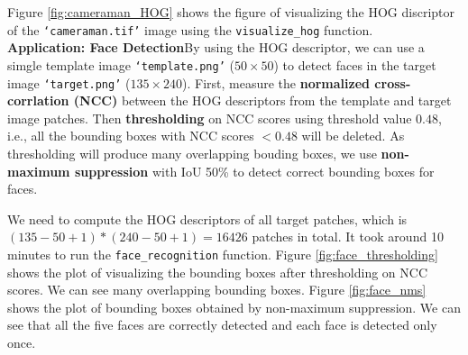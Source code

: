 \documentclass[11pt]{scrartcl}
\begin{document}
Figure \ref{fig:cameraman_HOG} shows the figure of visualizing the HOG discriptor of the \texttt{`cameraman.tif'} image using the \texttt{visualize\_hog} function.
\\
\textbf{Application: Face Detection}\quad By using the HOG descriptor, we can use a simgle template image \texttt{`template.png'} ($50\times50$) to detect faces in the target image \texttt{`target.png'} ($135\times240$). First, measure the \textbf{normalized cross-corrlation (NCC)} between the HOG descriptors from the template and target image patches. Then \textbf{thresholding} on NCC scores using threshold value $0.48$, i.e., all the bounding boxes with NCC scores $<0.48$ will be deleted. As thresholding will produce many overlapping bouding boxes, we use \textbf{non-maximum suppression} with IoU 50\% to detect correct bounding boxes for faces.

We need to compute the HOG descriptors of all target patches, which is $(135-50+1)*(240-50+1)=16426$ patches in total. It took around 10 minutes to run the \texttt{face\_recognition} function. Figure \ref{fig:face_thresholding} shows the plot of visualizing the bounding boxes after thresholding on NCC scores. We can see many overlapping bounding boxes. Figure \ref{fig:face_nms} shows the plot of bounding boxes obtained by non-maximum suppression. We can see that all the five faces are correctly detected and each face is detected only once.
\end{document}
